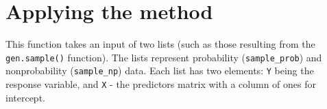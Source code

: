 \documentclass[
]{article}
\newenvironment{Shaded}{\begin{snugshade}}{\end{snugshade}}
\newcommand{\AttributeTok}[1]{\textcolor[rgb]{0.77,0.63,0.00}{#1}}
\newcommand{\ControlFlowTok}[1]{\textcolor[rgb]{0.13,0.29,0.53}{\textbf{#1}}}
\newcommand{\DecValTok}[1]{\textcolor[rgb]{0.00,0.00,0.81}{#1}}
\newcommand{\FunctionTok}[1]{\textcolor[rgb]{0.00,0.00,0.00}{#1}}
\newcommand{\NormalTok}[1]{#1}
\newcommand{\OtherTok}[1]{\textcolor[rgb]{0.56,0.35,0.01}{#1}}
\newcommand{\SpecialCharTok}[1]{\textcolor[rgb]{0.00,0.00,0.00}{#1}}
\begin{document}
\begin{Shaded}
\end{Shaded}

\hypertarget{applying-the-method}{%
\section{Applying the method}\label{applying-the-method}}

This function takes an input of two lists (such as those resulting from
the \texttt{gen.sample()} function). The lists represent probability
(\texttt{sample\_prob}) and nonprobability (\texttt{sample\_np}) data.
Each list has two elements: \texttt{Y} being the response variable, and
\texttt{X} - the predictors matrix with a column of ones for intercept.
\end{document}
